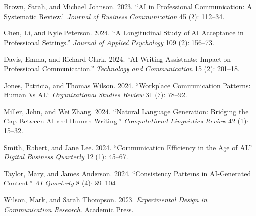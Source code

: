 \documentclass[
]{article}
\newlength{\cslhangindent}
\newenvironment{CSLReferences}[2] %
 {\begin{list}{}{%
  \setlength{\itemindent}{0pt}
  \setlength{\leftmargin}{0pt}
  \setlength{\parsep}{0pt}
  \ifodd #1
   \setlength{\leftmargin}{\cslhangindent}
   \setlength{\itemindent}{-1\cslhangindent}
  \fi
  \setlength{\itemsep}{#2\baselineskip}}}
 {\end{list}}
\begin{document}
\label{refs}
\begin{CSLReferences}{1}{0}
Brown, Sarah, and Michael Johnson. 2023. {``AI in Professional
Communication: A Systematic Review.''} \emph{Journal of Business
Communication} 45 (2): 112--34.

Chen, Li, and Kyle Peterson. 2024. {``A Longitudinal Study of AI
Acceptance in Professional Settings.''} \emph{Journal of Applied
Psychology} 109 (2): 156--73.

Davis, Emma, and Richard Clark. 2024. {``AI Writing Assistants: Impact
on Professional Communication.''} \emph{Technology and Communication} 15
(2): 201--18.

Jones, Patricia, and Thomas Wilson. 2024. {``Workplace Communication
Patterns: Human Vs AI.''} \emph{Organizational Studies Review} 31 (3):
78--92.

Miller, John, and Wei Zhang. 2024. {``Natural Language Generation:
Bridging the Gap Between AI and Human Writing.''} \emph{Computational
Linguistics Review} 42 (1): 15--32.

Smith, Robert, and Jane Lee. 2024. {``Communication Efficiency in the
Age of AI.''} \emph{Digital Business Quarterly} 12 (1): 45--67.

Taylor, Mary, and James Anderson. 2024. {``Consistency Patterns in
AI-Generated Content.''} \emph{AI Quarterly} 8 (4): 89--104.

Wilson, Mark, and Sarah Thompson. 2023. \emph{Experimental Design in
Communication Research}. Academic Press.

\end{CSLReferences}
\end{document}
